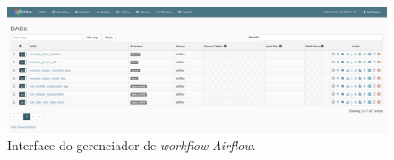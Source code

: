 \begin{figure}[!t]
    \centering
    \includegraphics[width=\linewidth]{Imagens/dags}
    \caption{Interface do gerenciador de \textit{workflow} \textit{Airflow}.}
    \label{fig:airflow}
\end{figure}






